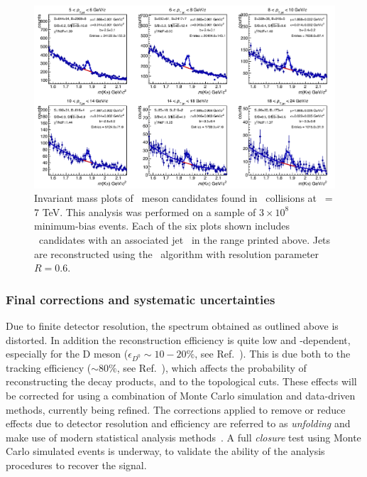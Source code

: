 \documentclass[12pt, a4paper, twoside, titlepage]{article}
\begin{document}
\begin{figure}[tb]
\begin{center}
\includegraphics[width=1.0\textwidth]{img/InvMassSingleDiff}
 \caption{Invariant mass plots of \Dzero\ meson candidates found in \pp\ collisions at \s\ = 7 TeV. This analysis
 was performed on a sample of $3\times 10^8$ minimum-bias events. Each of the six plots shown includes \Dzero\ candidates
 with an associated jet \pt\ in the range printed above. Jets are reconstructed using the \antikt\ algorithm with resolution parameter $R=0.6$. } 
 \label{fig:InvMassSingleDiff}
\end{center}
\end{figure}
\subsubsection{Final corrections and systematic uncertainties}
Due to finite detector resolution, the spectrum obtained as outlined above is distorted. In addition the reconstruction efficiency is quite low
and \pt-dependent, especially for the D meson ($\epsilon_{D^0} \sim 10-20\%$, see Ref.~\cite{ALICE:2012d}). This is due both to the tracking efficiency ($\sim 80\%$, see Ref.~\cite{ALICE:2014b}),
which affects the probability of reconstructing the decay products, and to the topological cuts. These effects will be corrected for using a combination of Monte Carlo simulation and data-driven methods, currently being refined.
The corrections applied to remove or reduce effects due to detector resolution and efficiency are referred to as \emph{unfolding} and make use of modern statistical analysis methods~\cite{Hocker:1995, Dagostini:1995}.
A full \emph{closure} test using Monte Carlo simulated events is underway, to validate the ability of the analysis procedures to recover the signal.
\end{document}
